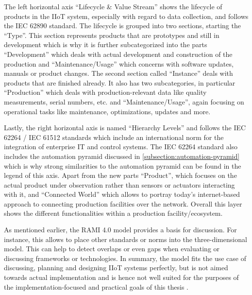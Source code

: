         \noindent The left horizontal axis ``Lifecycle \& Value Stream'' shows the lifecycle of products in the IIoT system, especially with regard to data collection, and follows the IEC 62890 standard. The lifecycle is grouped into two sections, starting the ``Type''. This section represents prod\-ucts that are prototypes and still in development which is why it is further subcategorized into the parts ``Development'' which deals with actual development and construction of the production and ``Maintenance/Usage'' which concerns with software updates, manuals or product changes. The second section called ``Instance'' deals with products that are finished already. It also has two subcategories, in particular ``Production'' which deals with production-relevant data like quality measurements, serial numbers, etc. and ``Maintenance/Usage'', again focusing on operational tasks like maintenance, optimizations, updates and more.\newline

        \noindent Lastly, the right horizontal axis is named ``Hierarchy Levels'' and follows the IEC 62264 / IEC 61512 standards which include an international norm for the integration of enterprise IT and control systems. The IEC 62264 standard also includes the automation pyramid discussed in \autoref{subsection:automation-pyramid} which is why strong similarities to the automation pyramid can be found in the legend of this axis. Apart from the new parts ``Product'', which focuses on the actual product under observation rather than sensors or actuators interacting with it, and ``Connected World'' which allows to portray today's internet-based approach to connecting production facilities over the network. Overall this layer shows the different functionalities within a production facility/ecosystem.

        As mentioned earlier, the RAMI 4.0 model provides a basis for discussion. For instance, this allows to place other standards or norms into the three-dimensional model. This can help to detect overlaps or even gaps when evaluating or discussing frameworks or technologies. In summary, the model fits the use case of discussing, planning and designing IIoT systems perfectly, but is not aimed towards actual implementation and is hence not well suited for the purposes of the implementation-focused and practical goals of this thesis \cite{koschnick_industrie_nodate}.

